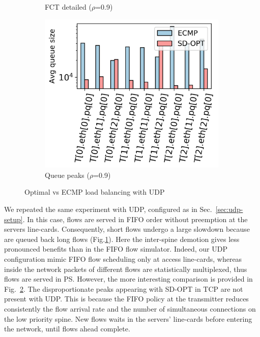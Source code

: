 \begin{figure}[!tb]
\begin{subfigure}{.33\textwidth}
		\captionsetup{justification=centering, width=0.7\linewidth}
		\caption{FCT detailed ($\rho$=0.9)}
		\label{fig:opt-vs-ecmp-fct-detailed-udp}
	\end{subfigure}%
	\hfill
	\begin{subfigure}{.33\textwidth}
		\centering
		\includegraphics[width=0.99\textwidth]{Chapter4/Figures/queue_peaks_N_1_udp}
		\caption{Queue peaks ($\rho$=0.9)}
		\label{fig:opt-vs-ecmp-queue-peaks-udp}		
	\end{subfigure}%
	\caption{Optimal vs ECMP load balancing with UDP}
	\label{fig:opt-vs-ecmp-lb-udp}
\end{figure}%
We repeated the same experiment with UDP, configured as in Sec.~\ref{sec:udp-setup}. In this case, flows are served in FIFO order without preemption at the servers line-cards. Consequently, short flows undergo a large slowdown because are queued back long flows (Fig.\ref{fig:opt-vs-ecmp-fct-detailed-udp}). Here the inter-spine demotion gives less pronounced benefits than in the FIFO flow simulator. Indeed, our UDP configuration mimic FIFO flow scheduling only at access line-cards, whereas inside the network packets of different flows are statistically multiplexed, thus flows are served in PS. However, the more interesting comparison is provided in Fig.~\ref{fig:opt-vs-ecmp-queue-peaks-udp}. The disproportionate peaks appearing with SD-OPT in TCP are not present with UDP. This is because the FIFO policy at the transmitter reduces consistently the flow arrival rate and the number of simultaneous connections on the low priority spine. New flows waits in the servers' line-cards before entering the network, until flows ahead complete. 
